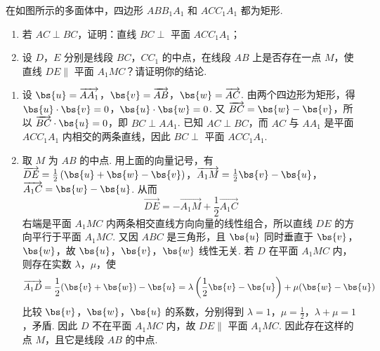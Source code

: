 \begin{problem}
在如图所示的多面体中，四边形 \(ABB_{1}A_{1}\) 和 \(ACC_{1}A_{1}\) 都为矩形.

\begin{enumerate}
\item 若 \(AC \perp BC\)，证明：直线 \(BC \perp\) 平面 \(ACC_{1}A_{1}\)；
\item 设 \(D\)，\(E\) 分别是线段 \(BC\)，\(CC_{1}\) 的中点，在线段 \(AB\) 上是否存在一点 \(M\)，使直线 \(DE \parallel\) 平面 \(A_{1}MC\)？请证明你的结论.
\end{enumerate}


\begin{solution}
\begin{enumerate}
\item 设 \(\bs{u}=\overrightarrow{AA_{1}}\)，\(\bs{v}=\overrightarrow{AB}\)，\(\bs{w}=\overrightarrow{AC}\). 由两个四边形为矩形，得 \(\bs{u}\cdot\bs{v}=0\)，\(\bs{u}\cdot\bs{w}=0\). 又 \(\overrightarrow{BC}=\bs{w}-\bs{v}\)，所以 \(\overrightarrow{BC}\cdot\bs{u}=0\)，即 \(BC\perp AA_{1}\). 已知 \(AC\perp BC\)，而 \(AC\) 与 \(AA_{1}\) 是平面 \(ACC_{1}A_{1}\) 内相交的两条直线，因此 \(BC\perp\) 平面 \(ACC_{1}A_{1}\).
\item 取 \(M\) 为 \(AB\) 的中点. 用上面的向量记号，有
\(\overrightarrow{DE}=\frac12\left(\bs{u}+\bs{w}-\bs{v}\right)\)，\(\overrightarrow{A_{1}M}=\frac12\bs{v}-\bs{u}\)，\(\overrightarrow{A_{1}C}=\bs{w}-\bs{u}\).
从而
\[
\overrightarrow{DE}=-\overrightarrow{A_{1}M}+\frac12\overrightarrow{A_{1}C}
\]
右端是平面 \(A_{1}MC\) 内两条相交直线方向向量的线性组合，所以直线 \(DE\) 的方向平行于平面 \(A_{1}MC\). 又因 \(ABC\) 是三角形，且 \(\bs{u}\) 同时垂直于 \(\bs{v}\)，\(\bs{w}\)，故 \(\bs{u}\)，\(\bs{v}\)，\(\bs{w}\) 线性无关. 若 \(D\) 在平面 \(A_{1}MC\) 内，则存在实数 \(\lambda\)，\(\mu\)，使
\[
\overrightarrow{A_{1}D}=\frac12(\bs{v}+\bs{w})-\bs{u}=\lambda\left(\frac12\bs{v}-\bs{u}\right)+\mu(\bs{w}-\bs{u})
\]
比较 \(\bs{v}\)，\(\bs{w}\)，\(\bs{u}\) 的系数，分别得到 \(\lambda=1\)，\(\mu=\frac12\)，\(\lambda+\mu=1\)，矛盾. 因此 \(D\) 不在平面 \(A_{1}MC\) 内，故 \(DE\parallel\) 平面 \(A_{1}MC\). 因此存在这样的点 \(M\)，且它是线段 \(AB\) 的中点.
\end{enumerate}
\end{solution}
\end{problem}

